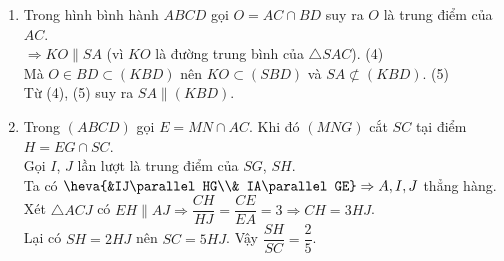 \begin{ex}
{\begin{center}
		\end{center}
		\begin{enumerate}
			\item Trong hình bình hành $ABCD$ gọi $O=AC \cap BD$ suy ra $O$ là trung điểm của $AC$.
			      \\
			      $\Rightarrow KO \parallel SA$ (vì $KO$ là đường trung bình của $\triangle SAC$). \hfill (4)
			      \\
			      Mà $O\in BD \subset (KBD)$ nên $KO\subset (SBD)$ và $SA\not\subset (KBD)$.  \hfill (5)
			      \\
			      Từ (4), (5) suy ra $SA \parallel (KBD)$.
			\item Trong $(ABCD)$ gọi $E=MN\cap AC$. Khi đó $(MNG)$ cắt $SC$ tại điểm $H=EG\cap SC$.
			      \\
			      Gọi $I$, $J$ lần lượt là trung điểm của $SG$, $SH$.
			      \\
			      Ta có $\heva{&IJ\parallel HG\\& IA\parallel GE}\Rightarrow A,I,J$ thẳng hàng.
			      \\
			      Xét $\triangle ACJ$ có $EH\parallel AJ \Rightarrow \dfrac{CH}{HJ}=\dfrac{CE}{EA}=3 \Rightarrow CH=3HJ$.
			      \\
			      Lại có $SH=2HJ$ nên $SC=5HJ$. Vậy $\dfrac{SH}{SC}=\dfrac{2}{5}$.
		\end{enumerate}
	}
\end{ex}
